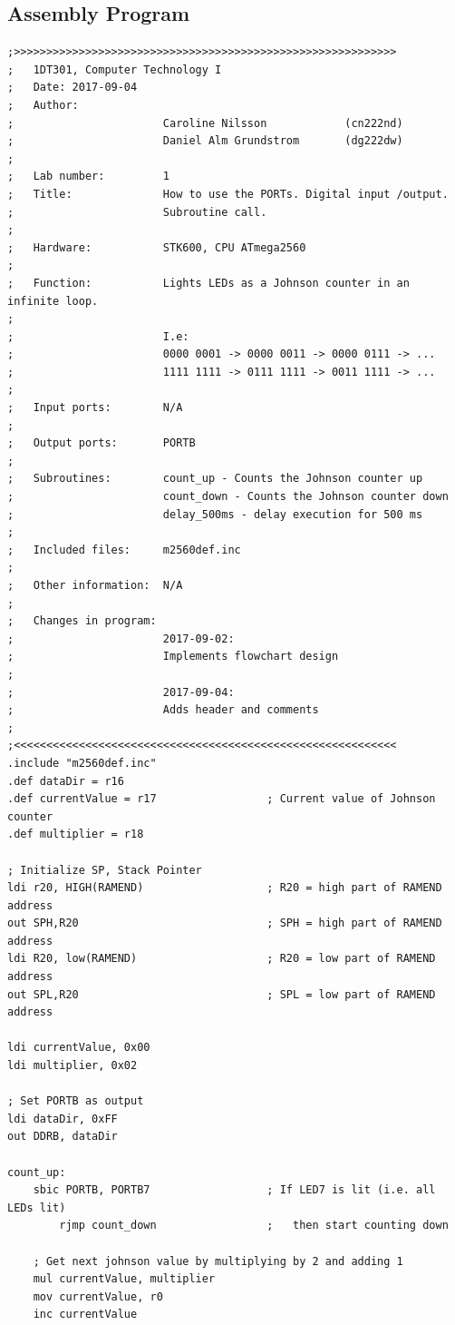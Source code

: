\documentclass[a4paper, 12pt]{article}
\begin{document}
\subsection{Assembly Program}
\begin{lstlisting}[basicstyle=\tiny]
;>>>>>>>>>>>>>>>>>>>>>>>>>>>>>>>>>>>>>>>>>>>>>>>>>>>>>>>>>>>
;   1DT301, Computer Technology I
;   Date: 2017-09-04
;   Author:
;                       Caroline Nilsson            (cn222nd)
;                       Daniel Alm Grundstrom       (dg222dw)
;
;   Lab number:         1
;   Title:              How to use the PORTs. Digital input /output.
;                       Subroutine call.
;
;   Hardware:           STK600, CPU ATmega2560
;
;   Function:           Lights LEDs as a Johnson counter in an infinite loop. 
;
;                       I.e:
;                       0000 0001 -> 0000 0011 -> 0000 0111 -> ...
;                       1111 1111 -> 0111 1111 -> 0011 1111 -> ...
;
;   Input ports:        N/A
;
;   Output ports:       PORTB
;
;   Subroutines:        count_up - Counts the Johnson counter up
;                       count_down - Counts the Johnson counter down
;                       delay_500ms - delay execution for 500 ms
;
;   Included files:     m2560def.inc
;
;   Other information:  N/A
;
;   Changes in program: 
;                       2017-09-02:
;                       Implements flowchart design
;
;                       2017-09-04:
;                       Adds header and comments
;
;<<<<<<<<<<<<<<<<<<<<<<<<<<<<<<<<<<<<<<<<<<<<<<<<<<<<<<<<<<<
.include "m2560def.inc"
.def dataDir = r16
.def currentValue = r17                 ; Current value of Johnson counter
.def multiplier = r18

; Initialize SP, Stack Pointer
ldi r20, HIGH(RAMEND)                   ; R20 = high part of RAMEND address
out SPH,R20                             ; SPH = high part of RAMEND address
ldi R20, low(RAMEND)                    ; R20 = low part of RAMEND address
out SPL,R20                             ; SPL = low part of RAMEND address

ldi currentValue, 0x00
ldi multiplier, 0x02

; Set PORTB as output
ldi dataDir, 0xFF
out DDRB, dataDir

count_up:
    sbic PORTB, PORTB7                  ; If LED7 is lit (i.e. all LEDs lit)
        rjmp count_down                 ;   then start counting down

    ; Get next johnson value by multiplying by 2 and adding 1
    mul currentValue, multiplier
    mov currentValue, r0
    inc currentValue


\end{lstlisting}
\end{document}
